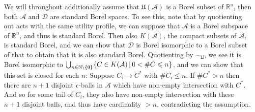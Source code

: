 \documentclass[a4paper]{article}
\newcommand\A{\mathcal{A}}
\newcommand\U{\mathfrak{U}} %
\newcommand{\Decs}{\mathcal{D}}
\renewcommand{\Re}{\mathbb{R}}
\renewcommand{\color}[1]{}
\newenvironment{colored}[1]{\leavevmode\color{#1}}{}
\newcommand\SetDelimiter[1][]{
	\nonscript\,#1\vert \allowbreak \nonscript\,\mathopen{}}
\providecommand\given{\SetDelimiter}
\renewcommand{\leq}{\leqslant}
\newenvironment{CCM rewritten}
{\begingroup\color{blue}} %
{\endgroup}              %
\begin{document}
\begin{colored}{violet}
	
	We will throughout additionally assume that $\U(\A)$ is a Borel subset of $\Re^n$, then both $\A$ and $\Decs$ are standard Borel spaces.
	 \begin{colored}{red}
	 	To see this, note that by quotienting out acts with the same utility profile, we can suppose that $\A$ is a Borel subspace of $\Re^n$, and thus is standard Borel. Then also $K(\A)$, the compact subsets of $\A$, is standard Borel, and we can show that $\Decs$ is Borel isomorphic to a Borel subset of that to obtain that it is also standard Borel.
	 Quotienting by $\sim_\U$, we see it is Borel isomorphic to $\bigcup_{n\in\mathbb{N}\setminus\{0\}}\{C\in K(\A)\given 0<\# C\leq n\}$, and we can show that this set is closed for each $n$: Suppose $C_i\longrightarrow C^*$ with $\# C_i\leq n$. If $\# C^* >n$ then there are $n+1$ disjoint $\epsilon$-balls in $\A$ which have non-empty intersection with $C^*$. And so for some tail of $C_i$, they also have non-empty intersection with these $n+1$ disjoint balls, and thus have cardinality $>n$, contradicting the assumption. 
	 \end{colored}
	

\end{colored}
\end{document}
